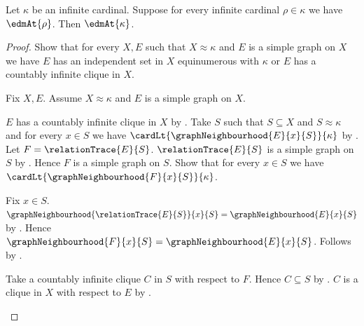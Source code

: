 \begin{theorem}\label{erdos_dushnik_miller_step}
    Let $\kappa$ be an infinite cardinal.
    Suppose for every infinite cardinal $\rho\in\kappa$ we have $\edmAt{\rho}$.
    Then $\edmAt{\kappa}$.
\end{theorem}
\begin{proof}
    Show that for every $X,E$ such that $X\approx\kappa$ and
        $E$ is a simple graph on $X$ we have
        $E$ has an independent set in $X$ equinumerous with $\kappa$ or
        $E$ has a countably infinite clique in $X$.
    \begin{subproof}
        Fix $X,E$.
        Assume $X\approx\kappa$ and $E$ is a simple graph on $X$.
        \begin{byCase}
                $E$ has a countably infinite clique in $X$ by
                    .
                Take $S$ such that $S\subseteq X$ and $S\approx\kappa$ and
                    for every $x\in S$ we have
                        $\cardLt{\graphNeighbourhood{E}{x}{S}}{\kappa}$ by
                    .
                Let $F=\relationTrace{E}{S}$.
                $\relationTrace{E}{S}$ is a simple graph on $S$ by
                    .
                Hence $F$ is a simple graph on $S$.
                Show that for every $x\in S$ we have
                    $\cardLt{\graphNeighbourhood{F}{x}{S}}{\kappa}$.
                \begin{subproof}
                    Fix $x\in S$.
                    $\graphNeighbourhood{\relationTrace{E}{S}}{x}{S}
                        =\graphNeighbourhood{E}{x}{S}$ by
                        .
                    Hence $\graphNeighbourhood{F}{x}{S}
                        =\graphNeighbourhood{E}{x}{S}$.
                    Follows by \auto.
                \end{subproof}
                \begin{byCase}
                        Take a countably infinite clique $C$ in $S$
                            with respect to $F$.
                        Hence $C\subseteq S$ by .
                        $C$ is a clique in $X$ with respect to $E$ by
                            .

\end{byCase}
\end{byCase}
\end{subproof}
\end{proof}
